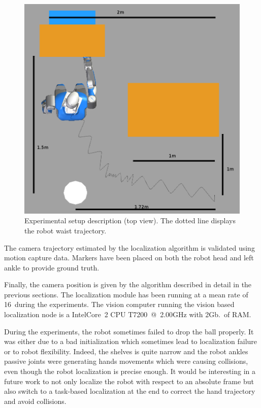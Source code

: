 %
\begin{figure}[ht!]
  \begin{center}
    \includegraphics[width=\linewidth]{images/dimensions.png}
  \end{center}
  \caption{Experimental setup description (top view). The dotted line displays the robot waist trajectory.\label{fig:xp_setup_dim}}
\end{figure}
%
The camera trajectory estimated by the localization algorithm is validated using motion capture data. Markers have been placed on both the robot head and left ankle to provide ground truth.

Finally, the camera position is given by the algorithm described in detail in the previous sections. The localization module has been running at a mean rate of 16\hertz~during the experiments. The
vision computer running the vision based localization node is a Intel\textregistered Core\texttrademark\ 2 CPU T7200~@~2.00GHz with 2Gb.\ of RAM.

During the experiments, the robot sometimes failed to drop the ball properly. It was either due to a bad initialization which sometimes lead to localization failure or to robot flexibility. Indeed, the shelves is quite narrow and the robot ankles passive joints were generating hands movements which were causing collisions, even though the robot localization is precise enough. It would be interesting in a
future work to not only localize the robot with respect to an absolute frame but also switch to a task-based localization at the end to correct the hand trajectory and avoid collisions.

